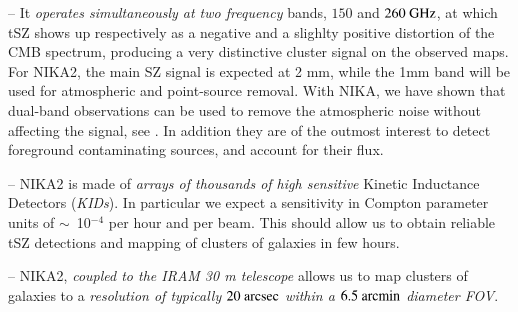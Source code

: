 \documentclass[11pt,a4paper,twoside,graphicx,color]{article}
\newcommand{\emp}[1]{\emph{#1}}
\begin{document}
-- It \emp{operates simultaneously at two frequency} bands, $150$ and
$260~\rm{GHz}$, at which tSZ shows up respectively as a negative and a slighlty positive
distortion of the CMB spectrum, producing a very distinctive cluster
signal on the observed maps. For NIKA2, the main SZ signal is expected at 2 mm, while the 1mm band will be used for atmospheric and
point-source removal.
With NIKA, we have shown that dual-band observations can be used to
remove the atmospheric noise without affecting the signal, see \cite{Adam2014,Adam2015,Adam2016,Adam2016a,Ruppin2016}.
In addition they are of the outmost interest to detect foreground
contaminating sources, and account for their flux.


-- NIKA2 is made of \emp{arrays of thousands of high sensitive}
Kinetic Inductance Detectors (\emp{KIDs}). In particular we expect a
sensitivity in Compton parameter units of $\sim$~10$^{-4}$ per hour
and per beam. This should allow us to obtain reliable tSZ detections
and mapping of clusters of galaxies in few hours.

-- NIKA2, \emp{coupled to the IRAM 30 m telescope} allows us to map
clusters of galaxies to a \emp{resolution of typically $20~\rm{arcsec}$
  within a $6.5~\rm{arcmin}$ diameter FOV}.
\end{document}
